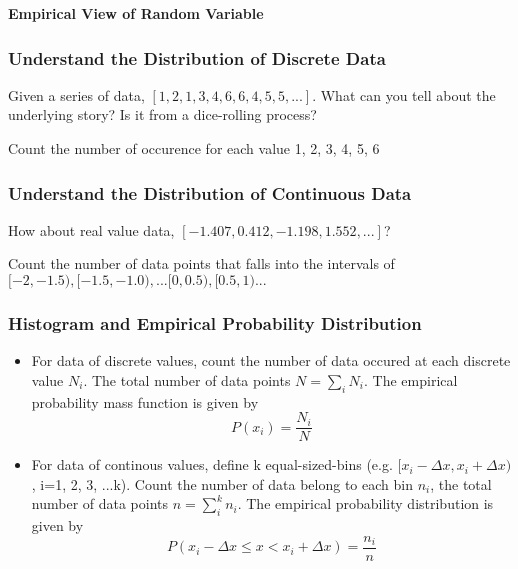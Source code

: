 \documentclass[notheorems, aspectratio=54]{beamer}
\begin{document}
\begin{frame}
\begin{center}
\bf{Empirical View of Random Variable}
\end{center}
\end{frame}


\begin{frame}
\frametitle{Understand the Distribution of Discrete Data}
Given a series of data, $ [1, 2, 1, 3, 4, 6, 6, 4, 5, 5, ... ]$. What can you tell about the underlying story? Is it from a dice-rolling process? 

\vspace{3mm}

Count the number of occurence for each value 1, 2, 3, 4, 5, 6
\end{frame}

\begin{frame}
\frametitle{Understand the Distribution of Continuous Data}
How about real value data, $[-1.407, 0.412, -1.198, 1.552, ...]$? 

\vspace{3mm}
Count the number of data points that falls into the intervals of $[-2, -1.5), [-1.5, -1.0), ... [0, 0.5), [0.5, 1) ...$

\end{frame}


\begin{frame}
\frametitle{Histogram and Empirical Probability Distribution}
\begin{itemize}
\item For data of discrete values, count the number of data occured at each discrete value $N_i$. The total number of data points $N=\sum_{i}N_i$. The empirical probability mass function is given by $$P(x_i)=\frac{N_i}{N}$$
\item For data of continous values, define k equal-sized-bins (e.g. $[x_i-\Delta x, x_i+\Delta x)$, i=1, 2, 3, ...k). Count the number of data belong to each bin $n_i$, the total number of data points $n=\sum_{i}^{k}n_i$. The empirical probability distribution is given by $$P(x_i-\Delta x \leq x < x_i+\Delta x )=\frac{n_i}{n}$$

\end{itemize}
\end{frame}
\end{document}
